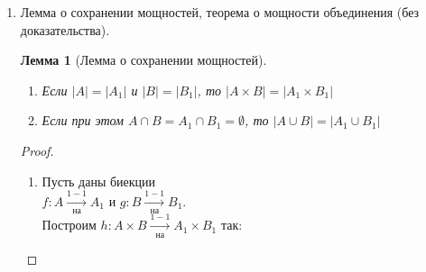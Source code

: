 \documentclass[a4paper]{article}
\newtheorem*{lemma*}{Лемма}
\theoremstyle{definition}
\newtheorem*{definition*}{Определение}
\newtheorem*{consequence*}{Следствие}
\begin{document}
\begin{enumerate}
       \begin{definition*}[Континуальное множество]
        Множество $A$ \textit{континуально}, если $|A| = |\mathbb{R}|$.
       \end{definition*}
       \begin{definition*}[Не более чем счётное множество]
        Множество $A$ \textit{не более чем счётно}, если $|A| \leq |\mathbb{N}|$
       \end{definition*}
       \begin{consequence*}[Описание не более чем счётных множеств]
        Множество не более чем счётно тогда и только тогда, когда оно конечно или счётно.
       \end{consequence*}
       \begin{proof}
        $\Leftarrow$: счётное множество не более чем счётно. Если $A$ конечно, то $|A| = |\mathbb{N} _k|\leq |\mathbb{N}|$. \\
        $\Rightarrow$: Пусть $A$ не более чем счётно. Предположим, что оно бесконечно. Тогда в $A$ есть счётное подмножество $B$. Получаем, что $|\mathbb{N}| - |B| \leq |A| \leq |\mathbb{N}|$. По теореме Кантора-Бернштейна $|A| = |\mathbb{N}|$.
       \end{proof}
 \item Лемма о сохранении мощностей, теорема о мощности объединения (без доказательства).
       \begin{lemma*}[Лемма о сохранении мощностей]\mbox{}\\
        \begin{enumerate}
         \item Если $\left | A \right | = \left | A_{1} \right |$ и $\left | B \right | = \left | B_{1} \right |$, то $\left | A\times B \right | = \left | A_{1}\times B_{1} \right |$\\
         \item Если при этом $A\cap B = A_{1}\cap B_{1}=\emptyset $, то $\left | A \cup B \right | =\left | A_{1} \cup B_{1} \right |  $
        \end{enumerate}
       \end{lemma*}
       \begin{proof}\mbox{}\\
        \begin{enumerate}
         \item Пусть даны биекции \\$f : A\xrightarrow[\text{на}]{1-1}A_{1}$ и $g : B\xrightarrow[\text{на}]{1-1}B_{1}$.\\
                Построим $h : A \times B\xrightarrow[\text{на}]{1-1}A_{1} \times B_{1}$ так:

\end{enumerate}
\end{proof}
\end{enumerate}
\end{document}
